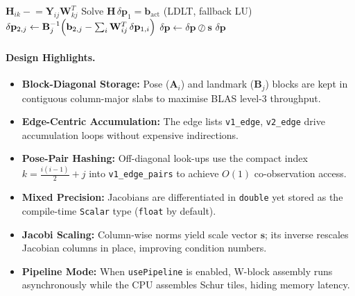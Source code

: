 \begin{algorithm}[H]
\begin{algorithmic}[1]
    \State $\mathbf{H}_{ik} \mathrel{-}= \mathbf{Y}_{ij}\mathbf{W}_{kj}^T$
  \EndFor
\EndFor
\State Solve $\mathbf{H}\,\delta\mathbf{p}_1 = \mathbf{b}_{\mathrm{act}}$ (LDLT, fallback LU)
  \State $\delta\mathbf{p}_{2,j} \gets \mathbf{B}^{-1}_{j}\Bigl(\mathbf{b}_{2,j}-\sum_{i}\mathbf{W}_{ij}^{T}\,\delta\mathbf{p}_{1,i}\Bigr)$
\EndFor
\State $\delta\mathbf{p} \gets \delta\mathbf{p} \oslash \mathbf{s}$ %
\State \Return $\delta\mathbf{p}$
\end{algorithmic}
\end{algorithm}

\paragraph{Design Highlights.}
\begin{itemize}[leftmargin=*]
  \item \textbf{Block-Diagonal Storage:} Pose ($\mathbf{A}_i$) and landmark ($\mathbf{B}_j$) blocks are kept in contiguous column-major slabs to maximise BLAS level-3 throughput.
  \item \textbf{Edge-Centric Accumulation:} The edge lists \verb|v1_edge|, \verb|v2_edge| drive accumulation loops without expensive indirections.
  \item \textbf{Pose-Pair Hashing:} Off-diagonal look-ups use the compact index $k=\tfrac{i(i-1)}{2}+j$ into \verb|v1_edge_pairs| to achieve $O(1)$ co-observation access.
  \item \textbf{Mixed Precision:} Jacobians are differentiated in \texttt{double} yet stored as the compile-time \texttt{Scalar} type (\texttt{float} by default).
  \item \textbf{Jacobi Scaling:} Column-wise norms yield scale vector $\mathbf{s}$; its inverse rescales Jacobian columns in place, improving condition numbers.
  \item \textbf{Pipeline Mode:} When \texttt{usePipeline} is enabled, W-block assembly runs asynchronously while the CPU assembles Schur tiles, hiding memory latency.
\end{itemize}
